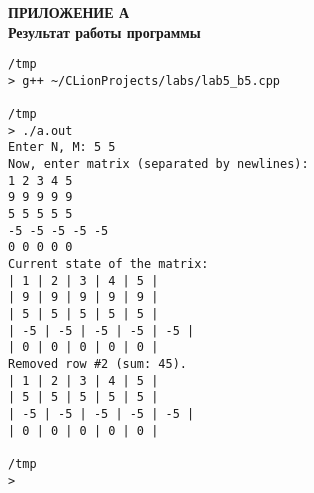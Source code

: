 \begin{center}
\label{section:appendix:a}
\textbf{
\MakeUppercase{Приложение А}\\
Результат работы программы}
\end{center}
\begin{lstlisting}[label={listing:appendix:result}]
/tmp
> g++ ~/CLionProjects/labs/lab5_b5.cpp

/tmp
> ./a.out
Enter N, M: 5 5
Now, enter matrix (separated by newlines):
1 2 3 4 5
9 9 9 9 9
5 5 5 5 5
-5 -5 -5 -5 -5
0 0 0 0 0
Current state of the matrix:
| 1 | 2 | 3 | 4 | 5 |
| 9 | 9 | 9 | 9 | 9 |
| 5 | 5 | 5 | 5 | 5 |
| -5 | -5 | -5 | -5 | -5 |
| 0 | 0 | 0 | 0 | 0 |
Removed row #2 (sum: 45).
| 1 | 2 | 3 | 4 | 5 |
| 5 | 5 | 5 | 5 | 5 |
| -5 | -5 | -5 | -5 | -5 |
| 0 | 0 | 0 | 0 | 0 |

/tmp
>
\end{lstlisting}


